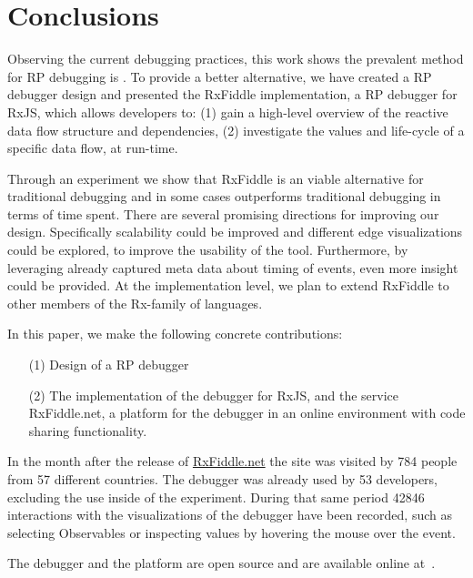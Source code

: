 \section{Conclusions} Observing the current debugging practices, this
work shows the prevalent method for RP debugging is \printfdebugging{}.
To provide a better alternative, we have created a RP debugger design
and presented the RxFiddle implementation, a RP debugger for RxJS, which
allows developers to:  (1) gain a high-level overview of the reactive
data flow structure and dependencies, (2) investigate the values and
life-cycle of a specific data flow, at run-time.

Through an experiment we show that RxFiddle is an viable alternative for
traditional debugging and in some cases outperforms traditional
debugging in terms of time spent.  There are several promising
directions for improving our design.  Specifically scalability could be
improved and different edge visualizations could be explored, to improve
the usability of the tool.  Furthermore, by leveraging already captured
meta data about timing of events, even more insight could be provided.
At the implementation level, we plan to extend RxFiddle to other members
of the Rx-family of languages.

In this paper, we make the following concrete contributions:
\begin{itemize}
    \item[(1)]
        Design of a RP debugger
    \item[(2)]
        The implementation of the debugger for RxJS, and the service
        RxFiddle.net, a platform for the debugger in an online
        environment with code sharing functionality.
\end{itemize}

In the month after the release of \href{https://RxFiddle.net}{RxFiddle.net}
the site was visited by 784 people from 57 different countries. The
debugger was already used by 53 developers, excluding the use inside of the
experiment. During that same period 42846 interactions with the
visualizations of the debugger have been recorded, such as selecting Observables
or inspecting values by hovering the mouse over the event.

The debugger and the platform are open source and are available online
at~\cite{rxfiddle-doi}.
